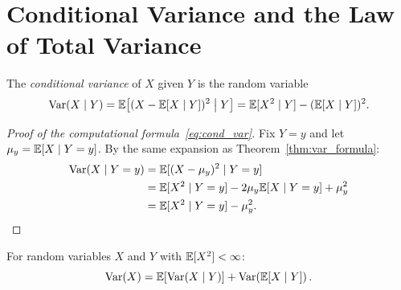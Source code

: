 \documentclass[11pt,a4paper]{article}
\begin{document}
\section{Conditional Variance and the Law of Total Variance}
\label{sec:cond_var}

\begin{definition}
\label{def:cond_var}
The \emph{conditional variance} of $X$ given $Y$ is the random
variable
\begin{equation}
  \operatorname{Var}(X \mid Y)
  = \mathbb{E}\!\left[(X - \mathbb{E}[X \mid Y])^2 \;\middle|\; Y\right]
  = \mathbb{E}[X^2 \mid Y] - (\mathbb{E}[X \mid Y])^2.
  \label{eq:cond_var}
\end{equation}
\end{definition}

\begin{proof}[Proof of the computational
  formula~\eqref{eq:cond_var}]
Fix $Y = y$ and let $\mu_y = \mathbb{E}[X \mid Y = y]$.  By the same
expansion as Theorem~\ref{thm:var_formula}:
\begin{align}
  \operatorname{Var}(X \mid Y = y)
  &= \mathbb{E}[(X - \mu_y)^2 \mid Y = y]
  \nonumber\\
  &= \mathbb{E}[X^2 \mid Y = y] - 2\mu_y \mathbb{E}[X \mid Y = y] + \mu_y^2
  \nonumber\\
  &= \mathbb{E}[X^2 \mid Y = y] - \mu_y^2. \qedhere
\end{align}
\end{proof}

\begin{keyresult}[title={Law of Total Variance}]
\begin{theorem}
\label{thm:total_variance}
For random variables $X$ and $Y$ with $\mathbb{E}[X^2] < \infty$:
\begin{equation}
  \operatorname{Var}(X) = \mathbb{E}\!\left[\operatorname{Var}(X \mid Y)\right]
  + \operatorname{Var}\!\left(\mathbb{E}[X \mid Y]\right).
  \label{eq:total_variance}
\end{equation}
\end{theorem}
\end{keyresult}
\end{document}
